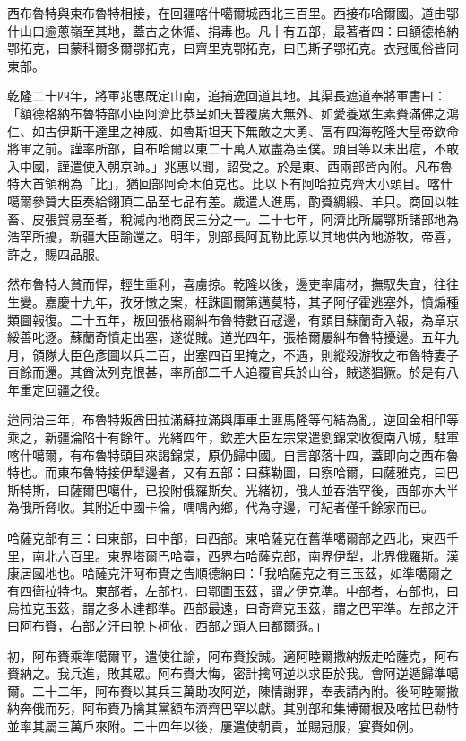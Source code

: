 \begin{pinyinscope}
西布魯特與東布魯特相接，在回疆喀什噶爾城西北三百里。西接布哈爾國。道由鄂什山口逾蔥嶺至其地，蓋古之休循、捐毒也。凡十有五部，最著者四：曰額德格納鄂拓克，曰蒙科爾多爾鄂拓克，曰齊里克鄂拓克，曰巴斯子鄂拓克。衣冠風俗皆同東部。

乾隆二十四年，將軍兆惠既定山南，追捕逸回道其地。其渠長遮道奉將軍書曰：「額德格納布魯特部小臣阿濟比恭呈如天普覆廣大無外、如愛養眾生素賚滿佛之鴻仁、如古伊斯干達里之神威、如魯斯坦天下無敵之大勇、富有四海乾隆大皇帝欽命將軍之前。謹率所部，自布哈爾以東二十萬人眾盡為臣僕。頭目等以未出痘，不敢入中國，謹遣使入朝京師。」兆惠以聞，詔受之。於是東、西兩部皆內附。凡布魯特大首領稱為「比」，猶回部阿奇木伯克也。比以下有阿哈拉克齊大小頭目。喀什噶爾參贊大臣奏給翎頂二品至七品有差。歲遣人進馬，酌賚綢緞、羊只。商回以牲畜、皮張貿易至者，稅減內地商民三分之一。二十七年，阿濟比所屬鄂斯諸部地為浩罕所擾，新疆大臣諭還之。明年，別部長阿瓦勒比原以其地供內地游牧，帝喜，許之，賜四品服。

然布魯特人貧而悍，輕生重利，喜虜掠。乾隆以後，邊吏率庸材，撫馭失宜，往往生變。嘉慶十九年，孜牙憞之案，枉誅圖爾第邁莫特，其子阿仔霍逃塞外，憤煽種類圖報復。二十五年，叛回張格爾糾布魯特數百寇邊，有頭目蘇蘭奇入報，為章京綏善叱逐。蘇蘭奇憤走出塞，遂從賊。道光四年，張格爾屢糾布魯特擾邊。五年九月，領隊大臣色彥圖以兵二百，出塞四百里掩之，不遇，則縱殺游牧之布魯特妻子百餘而還。其酋汰列克恨甚，率所部二千人追覆官兵於山谷，賊遂猖獗。於是有八年重定回疆之役。

迨同治三年，布魯特叛酋田拉滿蘇拉滿與庫車土匪馬隆等句結為亂，逆回金相印等乘之，新疆淪陷十有餘年。光緒四年，欽差大臣左宗棠遣劉錦棠收復南八城，駐軍喀什噶爾，有布魯特頭目來謁錦棠，原仍歸中國。自言部落十四，蓋即向之西布魯特也。而東布魯特接伊犁邊者，又有五部：曰蘇勒圖，曰察哈爾，曰薩雅克，曰巴斯特斯，曰薩爾巴噶什，已投附俄羅斯矣。光緒初，俄人並吞浩罕後，西部亦大半為俄所脅收。其附近中國卡倫，喁喁內鄉，代為守邊，可紀者僅千餘家而已。

哈薩克部有三：曰東部，曰中部，曰西部。東哈薩克在舊準噶爾部之西北，東西千里，南北六百里。東界塔爾巴哈臺，西界右哈薩克部，南界伊犁，北界俄羅斯。漢康居國地也。哈薩克汗阿布賚之告順德納曰：「我哈薩克之有三玉茲，如準噶爾之有四衛拉特也。東部者，左部也，曰鄂圖玉茲，謂之伊克準。中部者，右部也，曰烏拉克玉茲，謂之多木達都準。西部最遠，曰奇齊克玉茲，謂之巴罕準。左部之汗曰阿布賚，右部之汗曰脫卜柯依，西部之頭人曰都爾遜。」

初，阿布賚乘準噶爾平，遣使往諭，阿布賚投誠。適阿睦爾撒納叛走哈薩克，阿布賚納之。我兵進，敗其眾。阿布賚大悔，密計擒阿逆以求臣於我。會阿逆遁歸準噶爾。二十二年，阿布賚以其兵三萬助攻阿逆，陳情謝罪，奉表請內附。後阿睦爾撒納奔俄而死，阿布賚乃擒其黨額布濟齊巴罕以獻。其別部和集博爾根及喀拉巴勒特並率其屬三萬戶來附。二十四年以後，屢遣使朝貢，並賜冠服，宴賚如例。


\end{pinyinscope}
